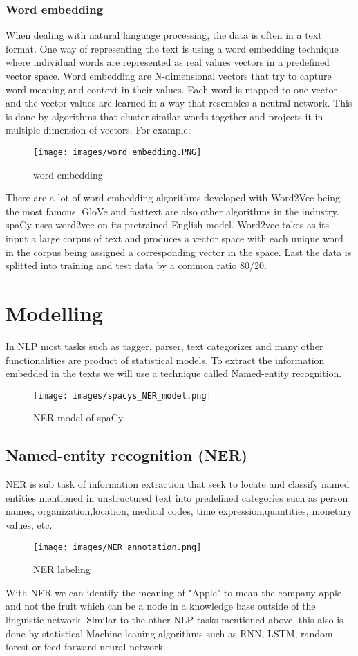 \subsubsection{Word embedding} 
When dealing with natural language processing, the data is often in a text format. One way of representing the text is using a word embedding technique where individual words are represented as real values vectors in a predefined vector space. Word embedding are N-dimensional vectors that try to capture word meaning and context in their values. Each word is mapped to one vector and the vector values are learned in a way that resembles a neutral network. This is done by algorithms that cluster similar words together and projects it in multiple dimension of vectors. 
For example:
\begin{figure}[hbt!]
    \centering
    \texttt{[image: images/word embedding.PNG]}
    \caption{word embedding}
    \label{fig:word rmbedding}
\end{figure}

  There are a lot of word embedding algorithms developed with Word2Vec being the most famous. GloVe and fasttext are also other algorithms in the industry. spaCy uses word2vec on its pretrained English model. Word2vec takes as its input a large corpus of text and produces a vector space with each unique word in the corpus being assigned a corresponding vector in the space.  
Last the data is splitted into training and test data by a common ratio 80/20.
\newpage
\section{Modelling} 
In NLP most tasks such as tagger, parser, text categorizer and many other functionalities are product of statistical models. To extract the information embedded in the texts we will use a technique called Named-entity recognition. 
\begin{figure}[hbt!]
    \centering
    \texttt{[image: images/spacys\_NER\_model.png]}
    \caption{NER model of spaCy}
    \label{fig:NER}
\end{figure}
 
\subsection{Named-entity recognition (NER)}
NER is sub task of information extraction that seek to locate and classify named entities mentioned in unstructured text into predefined categories such as person names, organization,location, medical codes, time expression,quantities, monetary values, etc.  
\begin{figure}[hbt!]
    \centering
    \texttt{[image: images/NER\_annotation.png]}
    \caption{NER labeling}
    \label{fig:annotationl}
\end{figure} 
With NER we can identify the meaning of "Apple" to mean the company apple and not the fruit which can be a node in a knowledge base outside of the linguistic network. 
Similar to the other NLP tasks mentioned above, this also is done by statistical Machine leaning algorithms such as RNN, LSTM, random forest or feed forward neural network. 

